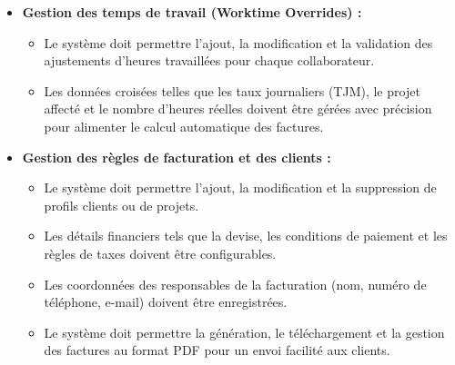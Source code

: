 \documentclass[12pt, a4paper, openany]{report}
\begin{document}
\begin{itemize}
    \vspace{-0.4cm}
    \item \textcolor{primaryBlue}{\textbf{Gestion des temps de travail (Worktime Overrides) :}}
    \begin{itemize}
        \renewcommand{\labelitemii}{\textcolor{royalBlue}{\textbullet}}
        \setlength{\itemsep}{0.2cm}
        \vspace{0.2cm}
        
        \vspace{-0.3cm}
        \item Le système doit permettre l'ajout, la modification et la validation des ajustements d'heures travaillées pour chaque collaborateur.
        \vspace{-0.3cm}
        \item Les données croisées telles que les taux journaliers (TJM), le projet affecté et le nombre d'heures réelles doivent être gérées avec précision pour alimenter le calcul automatique des factures.
    \end{itemize}

    \vspace{-0.4cm}
    \item \textcolor{primaryBlue}{\textbf{Gestion des règles de facturation et des clients :}}
    \begin{itemize}
        \renewcommand{\labelitemii}{\textcolor{royalBlue}{\textbullet}}
        \setlength{\itemsep}{0.2cm}
        \vspace{0.2cm}
        
        \vspace{-0.3cm}
        \item Le système doit permettre l'ajout, la modification et la suppression de profils clients ou de projets.
        \vspace{-0.3cm}
        \item Les détails financiers tels que la devise, les conditions de paiement et les règles de taxes doivent être configurables.
        \vspace{-0.3cm}
        \item Les coordonnées des responsables de la facturation (nom, numéro de téléphone, e-mail) doivent être enregistrées.
        \vspace{-0.3cm}
        \item Le système doit permettre la génération, le téléchargement et la gestion des factures au format PDF pour un envoi facilité aux clients.
    \end{itemize}


\end{itemize}
\end{document}
